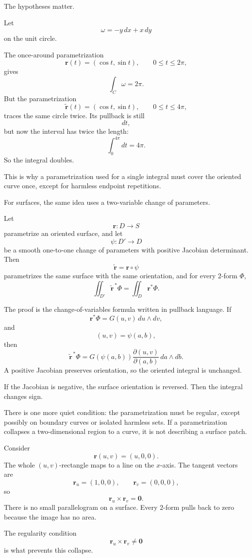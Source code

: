 The hypotheses matter.

\begin{example}
Let
\[
    \omega=-y\,dx+x\,dy
\]
on the unit circle.

The once-around parametrization
\[
    \mathbf r(t)=(\cos t,\sin t),
    \qquad
    0\le t\le2\pi,
\]
gives
\[
    \int_C\omega=2\pi.
\]
But the parametrization
\[
    \widetilde{\mathbf r}(t)=(\cos t,\sin t),
    \qquad
    0\le t\le4\pi,
\]
traces the same circle twice.  Its pullback is still
\[
    dt,
\]
but now the interval has twice the length:
\[
    \int_0^{4\pi}dt=4\pi.
\]
So the integral doubles.

This is why a parametrization used for a single integral must cover the oriented curve
once, except for harmless endpoint repetitions.
\end{example}

For surfaces, the same idea uses a two-variable change of parameters.

\begin{theorem}
Let
\[
    \mathbf r:D\to S
\]
parametrize an oriented surface, and let
\[
    \psi:D'\to D
\]
be a smooth one-to-one change of parameters with positive Jacobian determinant.
Then
\[
    \widetilde{\mathbf r}=\mathbf r\circ\psi
\]
parametrizes the same surface with the same orientation, and for every \(2\)-form
\(\Phi\),
\[
\boxed{
    \iint_{D'}\widetilde{\mathbf r}^{\,*}\Phi
    =
    \iint_D\mathbf r^*\Phi.
}
\]
\end{theorem}

The proof is the change-of-variables formula written in pullback language.  If
\[
    \mathbf r^*\Phi=G(u,v)\,du\wedge dv,
\]
and
\[
    (u,v)=\psi(a,b),
\]
then
\[
    \widetilde{\mathbf r}^{\,*}\Phi
    =
    G(\psi(a,b))
    \frac{\partial(u,v)}{\partial(a,b)}
    \,da\wedge db.
\]
A positive Jacobian preserves orientation, so the oriented integral is unchanged.

If the Jacobian is negative, the surface orientation is reversed.  Then the integral
changes sign.

There is one more quiet condition: the parametrization must be regular, except
possibly on boundary curves or isolated harmless sets.  If a parametrization collapses a
two-dimensional region to a curve, it is not describing a surface patch.

\begin{example}
Consider
\[
    \mathbf r(u,v)=(u,0,0).
\]
The whole \((u,v)\)-rectangle maps to a line on the \(x\)-axis.  The tangent vectors are
\[
    \mathbf r_u=(1,0,0),
    \qquad
    \mathbf r_v=(0,0,0),
\]
so
\[
    \mathbf r_u\times\mathbf r_v=\mathbf 0.
\]
There is no small parallelogram on a surface.  Every \(2\)-form pulls back to zero
because the image has no area.

The regularity condition
\[
    \mathbf r_u\times\mathbf r_v\ne\mathbf 0
\]
is what prevents this collapse.
\end{example}

